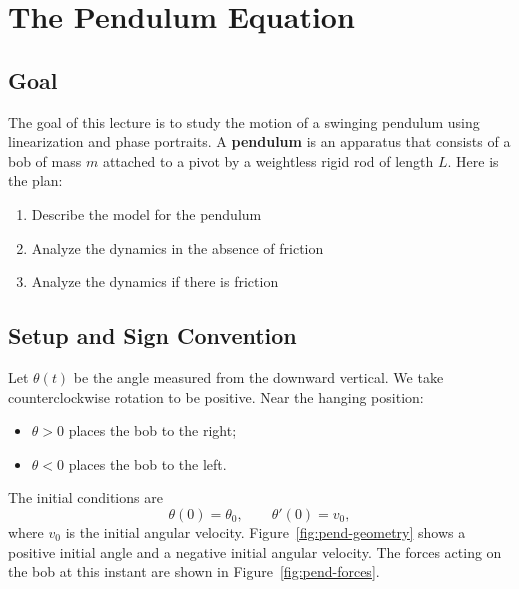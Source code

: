 \documentclass[11pt,letterpaper]{article}
\begin{document}
\section{The Pendulum Equation}

\subsection{Goal}
The goal of this lecture is to study the motion of a swinging pendulum using linearization and phase portraits. A \textbf{pendulum} is an apparatus that consists of a bob of mass $m$ attached
to a pivot by a weightless rigid rod of length $L$. Here is the plan:
\begin{enumerate}
    \item Describe the model for the pendulum
    \item Analyze the dynamics in the absence of friction
    \item Analyze the dynamics if there is friction
\end{enumerate}

\subsection{Setup and Sign Convention}

Let $\theta(t)$ be the angle measured from the
downward vertical. We take counterclockwise rotation
to be positive. Near the hanging position:
\begin{itemize}
    \item $\theta>0$ places the bob to the right;
    \item $\theta<0$ places the bob to the left.
\end{itemize}

The initial conditions are
\[
\theta(0)=\theta_0,
\qquad
\theta'(0)=v_0,
\]
where $v_0$ is the initial angular velocity.
Figure~\ref{fig:pend-geometry} shows a positive initial angle and
a negative initial angular velocity. The forces acting on the bob
at this instant are shown in Figure~\ref{fig:pend-forces}.
\end{document}
